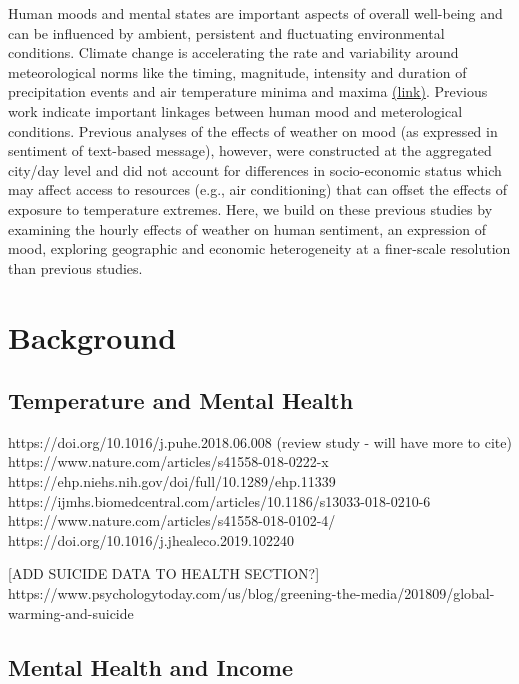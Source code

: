 \documentclass{article}
\begin{document}
Human moods and mental states are important aspects of overall well-being and can be influenced by ambient, persistent and fluctuating environmental conditions. Climate change is accelerating the rate and variability around meteorological norms like the timing, magnitude, intensity and duration of precipitation events and air temperature minima and maxima \href{https://www.ipcc.ch/site/assets/uploads/2018/03/SREX-Chap3_FINAL-1.pdf}{(link)}. Previous work \citep{baylis_weather_2018} indicate important linkages between human mood and meterological conditions. Previous analyses of the effects of weather on mood (as expressed in sentiment of text-based message), however, were constructed at the aggregated city/day level and did not account for differences in socio-economic status which may affect access to resources (e.g., air conditioning) that can offset the effects of exposure to temperature extremes. Here, we build on these previous studies by examining the hourly effects of weather on human sentiment, an expression of mood, exploring geographic and economic heterogeneity at a finer-scale resolution than previous studies.  


\section{Background}
\subsection{Temperature and Mental Health}



https://doi.org/10.1016/j.puhe.2018.06.008 (review study - will have more to cite)
https://www.nature.com/articles/s41558-018-0222-x
https://ehp.niehs.nih.gov/doi/full/10.1289/ehp.11339
https://ijmhs.biomedcentral.com/articles/10.1186/s13033-018-0210-6
https://www.nature.com/articles/s41558-018-0102-4/
https://doi.org/10.1016/j.jhealeco.2019.102240

[ADD SUICIDE DATA TO HEALTH SECTION?]
https://www.psychologytoday.com/us/blog/greening-the-media/201809/global-warming-and-suicide

\subsection{Mental Health and Income}
\end{document}
